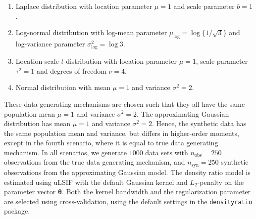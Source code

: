 \documentclass[
]{article}
\providecommand{\tightlist}{%
  \setlength{\itemsep}{0pt}\setlength{\parskip}{0pt}}\usepackage{longtable,booktabs,array}
\newcommand{\nobs}{n_{\text{obs}}}
\newcommand{\nsyn}{n_{\text{syn}}}
\begin{document}
\begin{enumerate}
\def\labelenumi{\arabic{enumi}.}
\tightlist
\item
  Laplace distribution with location parameter \(\mu = 1\) and scale
  parameter \(b = 1\).
\item
  Log-normal distribution with log-mean parameter
  \(\mu_{\text{log}} = \log \{1/\sqrt{3} \}\) and log-variance parameter
  \(\sigma^2_\text{log} = \log 3\).
\item
  Location-scale \(t\)-distribution with location parameter \(\mu = 1\),
  scale parameter \(\tau^2 = 1\) and degrees of freedom \(\nu = 4\).
\item
  Normal distribution with mean \(\mu = 1\) and variance
  \(\sigma^2 = 2\).
\end{enumerate}

These data generating mechanisms are chosen such that they all have the
same population mean \(\mu = 1\) and variance \(\sigma^2 = 2\). The
approximating Gaussian distribution has mean \(\mu = 1\) and variance
\(\sigma^2 = 2\). Hence, the synthetic data has the same population mean
and variance, but differs in higher-order moments, except in the fourth
scenario, where it is equal to true data generating mechanism. In all
scenarios, we generate \(1000\) data sets with \(\nobs = 250\)
observations from the true data generating mechanism, and
\(\nsyn = 250\) synthetic observations from the approximating Gaussian
model. The density ratio model is estimated using uLSIF with the default
Gaussian kernel and \(L_2\)-penalty on the parameter vector
\(\boldsymbol{\theta}\). Both the kernel bandwidth and the
regularization parameter are selected using cross-validation, using the
default settings in the \texttt{densityratio} package.

\linespread{1}
\end{document}
